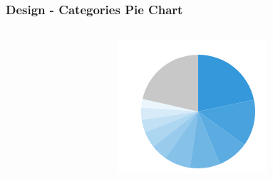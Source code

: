 \documentclass{beamer}
\begin{document}
\begin{frame}
\frametitle{Design - Categories Pie Chart}

\begin{columns}[T]
  \begin{column}{.7\textwidth}
    \begin{table}
    \end{table}
  \end{column}
  \begin{column}{.25\textwidth}
    \begin{figure}
      \centering
      \includegraphics[scale=0.3]{img/piechart.png}
    \end{figure}
  \end{column}
\end{columns}
\end{frame}
\end{document}
